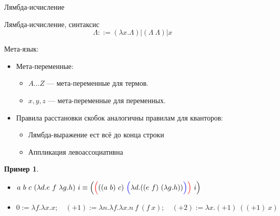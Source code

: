 \documentclass[aspectratio=169]{beamer}
\newtheorem{exm}{Пример}[section]
\begin{document}
\newcommand\doubleplus{+\kern-1.3ex+\kern0.8ex}
\newcommand\mdoubleplus{\ensuremath{\mathbin{+\mkern-10mu+}}}

\begin{frame}{}
\begin{center}\Large Лямбда-исчисление \end{center}
\end{frame}

\begin{frame}{Лямбда-исчисление, синтаксис}
$$\Lambda ::= (\lambda x.\Lambda) | (\Lambda\ \Lambda) | x$$

Мета-язык: 
\begin{itemize}
\item Мета-переменные:\begin{itemize}
\item $A\dots Z$ --- мета-переменные для термов. 
\item $x,y,z$ --- мета-переменные для переменных. 
\end{itemize}

\item Правила расстановки скобок аналогичны правилам для кванторов:
\begin{itemize}
\item Лямбда-выражение ест всё до конца строки
\item Аппликация левоассоциативна
\end{itemize}
\end{itemize}

\begin{exm}
\begin{itemize}
\item $a\ b\ c\ (\lambda d.e\ f\ \lambda g.h)\ i \equiv \Big({\color{red}\Big(}((a\ b)\ c)\ {\color{blue}\Big(}\lambda d.((e\ f)\ (\lambda g.h)){\color{blue}\Big)}{\color{red}\Big)}\ i\Big)$
\item $0 := \lambda f.\lambda x.x;\quad(+1) := \lambda n.\lambda f.\lambda x.n\ f\ (f\ x);\quad(+2) := \lambda x.(+1)\ ((+1)\ x)$
\end{itemize}
\end{exm}
\end{frame}
\end{document}
